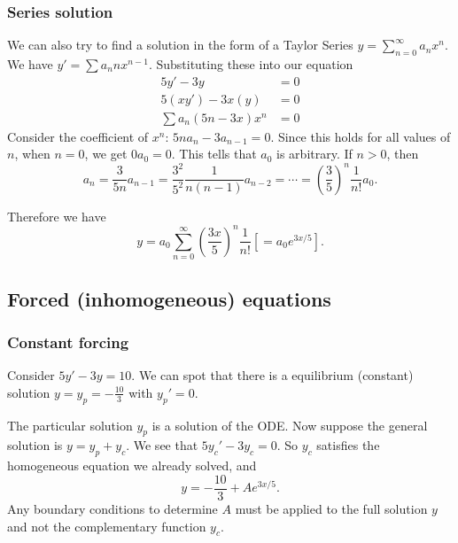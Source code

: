 \documentclass[a4paper]{article}
\begin{document}
  \subsubsection{Series solution}
  We can also try to find a solution in the form of a Taylor Series $y = \sum\limits_{n=0}^\infty a_nx^n$. We have $y' = \sum a_nnx^{n-1}$. Substituting these into our equation
  \begin{align*}
    5y' - 3y &= 0\\
    5(xy')  - 3x(y) &= 0\\
    \sum a_n(5n - 3x)x^n &= 0
  \end{align*}
  Consider the coefficient of $x^n$: $5n a_n - 3 a_{n-1} = 0$. Since this holds for all values of $n$, when $n = 0$, we get $0a_0 = 0$. This tells that $a_0$ is arbitrary. If $n>0$, then
  \[
    a_n = \frac{3}{5n}a_{n-1} = \frac{3^2}{5^2}\frac{1}{n(n-1)}a_{n-2} = \cdots = \left(\frac{3}{5}\right)^n \frac{1}{n!}a_0.
  \]

  Therefore we have
  \[
    y = a_0\sum_{n = 0}^\infty \left(\frac{3x}{5}\right)^n\frac{1}{n!} \left[= a_0 e^{3x/5}\right].
  \]

  \subsection{Forced (inhomogeneous) equations}
  \subsubsection{Constant forcing}
  \begin{eg}
    Consider $5y' - 3y = 10$. We can spot that there is a equilibrium (constant) solution $y = y_p = -\frac{10}{3}$ with $y_p' = 0$.

    The particular solution $y_p$ is a solution of the ODE. Now suppose the general solution is $y = y_p + y_c$. We see that $5y_c' - 3y_c = 0$. So $y_c$ satisfies the homogeneous equation we already solved, and
    \[
      y = -\frac{10}{3} + Ae^{3x/5}.
    \]
    \note Any boundary conditions to determine $A$ must be applied to the full solution $y$ and not the complementary function $y_c$. 
  \end{eg}
\end{document}
